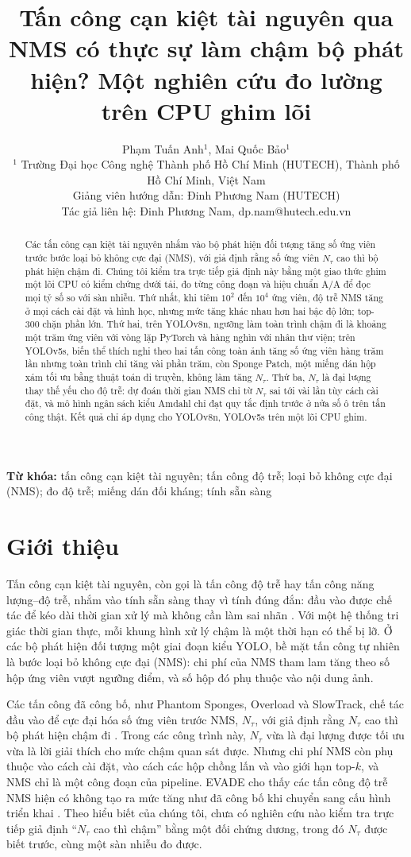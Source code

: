 \documentclass[12pt,a4paper]{article}
\title{Tấn công cạn kiệt tài nguyên qua NMS có thực sự làm chậm bộ phát hiện? Một nghiên cứu đo lường trên CPU ghim lõi}
\author{Phạm Tuấn Anh$^{1}$, Mai Quốc Bảo$^{1}$\\
{\small $^{1}$ Trường Đại học Công nghệ Thành phố Hồ Chí Minh (HUTECH), Thành phố Hồ Chí Minh, Việt Nam}\\
{\small Giảng viên hướng dẫn: Đinh Phương Nam (HUTECH)}\\
{\small Tác giả liên hệ: Đinh Phương Nam, dp.nam@hutech.edu.vn}}
\date{}
\newcommand{\Ntau}{N_{\tau}}
\begin{document}
\maketitle

\begin{abstract}
Các tấn công cạn kiệt tài nguyên nhắm vào bộ phát hiện đối tượng tăng số ứng viên trước bước loại bỏ không cực đại (NMS), với giả định rằng số ứng viên $\Ntau$ cao thì bộ phát hiện chậm đi. Chúng tôi kiểm tra trực tiếp giả định này bằng một giao thức ghim một lõi CPU có kiểm chứng dưới tải, đo từng công đoạn và hiệu chuẩn A/A để đọc mọi tỷ số so với sàn nhiễu. Thứ nhất, khi tiêm $10^2$ đến $10^4$ ứng viên, độ trễ NMS tăng ở mọi cách cài đặt và hình học, nhưng mức tăng khác nhau hơn hai bậc độ lớn; top-300 chặn phần lớn. Thứ hai, trên YOLOv8n, ngưỡng làm toàn trình chậm đi là khoảng một trăm ứng viên với vòng lặp PyTorch và hàng nghìn với nhân thư viện; trên YOLOv5s, biến thể thích nghi theo hai tấn công toàn ảnh tăng số ứng viên hàng trăm lần nhưng toàn trình chỉ tăng vài phần trăm, còn Sponge Patch, một miếng dán hộp xám tối ưu bằng thuật toán di truyền, không làm tăng $\Ntau$. Thứ ba, $\Ntau$ là đại lượng thay thế yếu cho độ trễ: dự đoán thời gian NMS chỉ từ $\Ntau$ sai tới vài lần tùy cách cài đặt, và mô hình ngân sách kiểu Amdahl chỉ đạt quy tắc định trước ở nửa số ô trên tấn công thật. Kết quả chỉ áp dụng cho YOLOv8n, YOLOv5s trên một lõi CPU ghim.
\end{abstract}

\noindent\textbf{Từ khóa:} tấn công cạn kiệt tài nguyên; tấn công độ trễ; loại bỏ không cực đại (NMS); đo độ trễ; miếng dán đối kháng; tính sẵn sàng

\section{Giới thiệu}
Tấn công cạn kiệt tài nguyên, còn gọi là tấn công độ trễ hay tấn công năng lượng--độ trễ, nhắm vào tính sẵn sàng thay vì tính đúng đắn: đầu vào được chế tác để kéo dài thời gian xử lý mà không cần làm sai nhãn \cite{shumailov2021sponge,nicgslowdown2022}. Với một hệ thống tri giác thời gian thực, mỗi khung hình xử lý chậm là một thời hạn có thể bị lỡ. Ở các bộ phát hiện đối tượng một giai đoạn kiểu YOLO, bề mặt tấn công tự nhiên là bước loại bỏ không cực đại (NMS): chi phí của NMS tham lam tăng theo số hộp ứng viên vượt ngưỡng điểm, và số hộp đó phụ thuộc vào nội dung ảnh.

Các tấn công đã công bố, như Phantom Sponges, Overload và SlowTrack, chế tác đầu vào để cực đại hóa số ứng viên trước NMS, $\Ntau$, với giả định rằng $\Ntau$ cao thì bộ phát hiện chậm đi \cite{phantom2023,overload2024,slowtrack2024}. Trong các công trình này, $\Ntau$ vừa là đại lượng được tối ưu vừa là lời giải thích cho mức chậm quan sát được. Nhưng chi phí NMS còn phụ thuộc vào cách cài đặt, vào cách các hộp chồng lấn và vào giới hạn top-$k$, và NMS chỉ là một công đoạn của pipeline. EVADE cho thấy các tấn công độ trễ NMS hiện có không tạo ra mức tăng như đã công bố khi chuyển sang cấu hình triển khai \cite{evade2025}. Theo hiểu biết của chúng tôi, chưa có nghiên cứu nào kiểm tra trực tiếp giả định ``$\Ntau$ cao thì chậm'' bằng một đối chứng dương, trong đó $\Ntau$ được biết trước, cùng một sàn nhiễu đo được.
\end{document}
